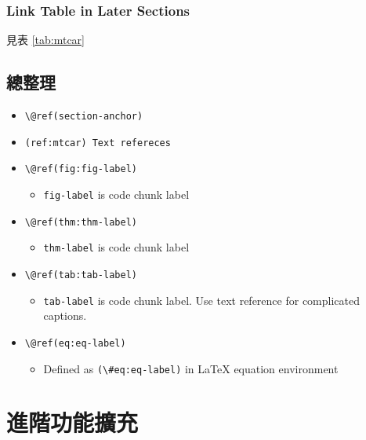 \documentclass[oneside]{book}
\providecommand{\tightlist}{%
  \setlength{\itemsep}{0pt}\setlength{\parskip}{0pt}}
\theoremstyle{definition}
\theoremstyle{definition}
\theoremstyle{definition}
\theoremstyle{remark}
\begin{document}
\hypertarget{link-table-in-later-sections}{%
\subsection*{Link Table in Later Sections}\label{link-table-in-later-sections}}

見表 \ref{tab:mtcar}

\section{總整理}

\begin{itemize}
\tightlist
\item
  \texttt{\textbackslash{}@ref(section-anchor)}
\item
  \texttt{(ref:mtcar)\ Text\ refereces}
\item
  \texttt{\textbackslash{}@ref(fig:fig-label)}

  \begin{itemize}
  \tightlist
  \item
    \texttt{fig-label} is code chunk label
  \end{itemize}
\item
  \texttt{\textbackslash{}@ref(thm:thm-label)}

  \begin{itemize}
  \tightlist
  \item
    \texttt{thm-label} is code chunk label
  \end{itemize}
\item
  \texttt{\textbackslash{}@ref(tab:tab-label)}

  \begin{itemize}
  \tightlist
  \item
    \texttt{tab-label} is code chunk label. Use text reference for complicated captions.
  \end{itemize}
\item
  \texttt{\textbackslash{}@ref(eq:eq-label)}

  \begin{itemize}
  \tightlist
  \item
    Defined as \texttt{(\textbackslash{}\#eq:eq-label)} in LaTeX equation environment
  \end{itemize}
\end{itemize}

\hypertarget{add-on}{%
\chapter{進階功能擴充}\label{add-on}}
\end{document}
